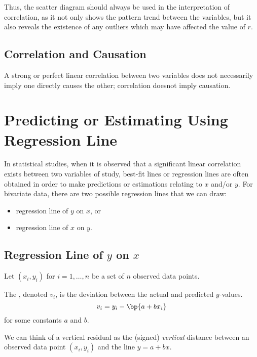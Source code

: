 Thus, the scatter diagram should always be used in the interpretation of correlation, as it not only shows the pattern trend between the variables, but it also reveals the existence of any outliers which may have affected the value of $r$.

\subsection{Correlation and Causation}

A strong or perfect linear correlation between two variables does not necessarily imply one directly causes the other; correlation doesnot imply causation.

\section{Predicting or Estimating Using Regression Line}

In statistical studies, when it is observed that a significant linear correlation exists between two variables of study, best-fit lines or regression lines are often obtained in order to make predictions or estimations relating to $x$ and/or $y$. For bivariate data, there are two possible regression lines that we can draw:
\begin{itemize}
    \item regression line of $y$ on $x$, or
    \item regression line of $x$ on $y$.
\end{itemize}

\subsection{Regression Line of $y$ on $x$}

Let $(x_i, y_i)$ for $i = 1, \dots, n$ be a set of $n$ observed data points.

\begin{definition}
    The , denoted $v_i$, is the deviation between the actual and predicted $y$-values. \[v_i = y_i - \bp{a + bx_i}\] for some constants $a$ and $b$.
\end{definition}

We can think of a vertical residual as the (signed) \emph{vertical} distance between an observed data point $(x_i, y_i)$ and the line $y = a + bx$.

